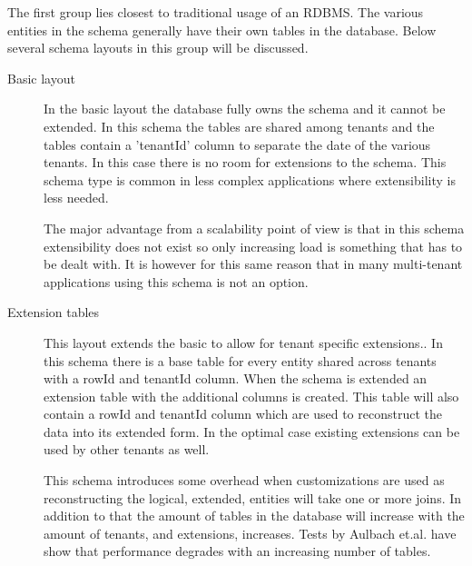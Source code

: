 The first group lies closest to traditional usage of an RDBMS. 
The various entities in the schema generally have their own tables in the database.
Below several schema layouts in this group will be discussed.
\begin{description}
	\item[Basic layout] In the basic layout the database fully owns the schema and it cannot be extended. 
		In this schema the tables are shared among tenants and the tables contain a 'tenantId' column to separate the date of the various tenants.
		In this case there is no room for extensions to the schema. 
		This schema type is common in less complex applications where extensibility is less needed. \cite{aulbach2008multi}
		
		The major advantage from a scalability point of view is that in this schema extensibility does not exist so only increasing load is something that has to be dealt with.
		It is however for this same reason that in many multi-tenant applications using this schema is not an option.
	\item[Extension tables]
		This layout extends the basic to allow for tenant specific extensions..
		In this schema there is a base table for every entity shared across tenants with a rowId and tenantId column.
		When the schema is extended an extension table with the additional columns is created.
		This table will also contain a rowId and tenantId column which are used to reconstruct the data into its extended form.
		In the optimal case existing extensions can be used by other tenants as well.

		This schema introduces some overhead when customizations are used as reconstructing the logical, extended, entities will take one or more joins. 
		In addition to that the amount of tables in the database will increase with the amount of tenants, and extensions, increases. Tests by Aulbach et.al. have show that performance degrades with an increasing number of tables.\cite{aulbach2008multi}
\end{description}

